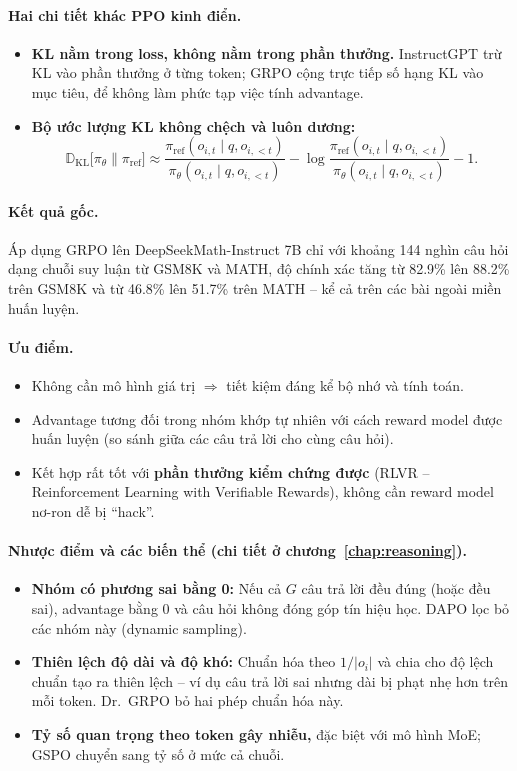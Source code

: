 \paragraph{Hai chi tiết khác PPO kinh điển.}
\begin{itemize}
	\item \textbf{KL nằm trong loss, không nằm trong phần thưởng.} InstructGPT trừ KL vào phần thưởng ở từng token; GRPO cộng trực tiếp số hạng KL vào mục tiêu, để không làm phức tạp việc tính advantage.
	\item \textbf{Bộ ước lượng KL không chệch và luôn dương:}
	\[
	\mathbb{D}_{\text{KL}}\big[\pi_\theta\|\pi_{\text{ref}}\big] \approx \frac{\pi_{\text{ref}}(o_{i,t}\mid q, o_{i,<t})}{\pi_\theta(o_{i,t}\mid q, o_{i,<t})} - \log\frac{\pi_{\text{ref}}(o_{i,t}\mid q, o_{i,<t})}{\pi_\theta(o_{i,t}\mid q, o_{i,<t})} - 1.
	\]
\end{itemize}

\paragraph{Kết quả gốc.} Áp dụng GRPO lên DeepSeekMath-Instruct 7B chỉ với khoảng 144 nghìn câu hỏi dạng chuỗi suy luận từ GSM8K và MATH, độ chính xác tăng từ 82.9\% lên 88.2\% trên GSM8K và từ 46.8\% lên 51.7\% trên MATH -- kể cả trên các bài ngoài miền huấn luyện.

\paragraph{Ưu điểm.}
\begin{itemize}
	\item Không cần mô hình giá trị $\Rightarrow$ tiết kiệm đáng kể bộ nhớ và tính toán.
	\item Advantage tương đối trong nhóm khớp tự nhiên với cách reward model được huấn luyện (so sánh giữa các câu trả lời cho cùng câu hỏi).
	\item Kết hợp rất tốt với \textbf{phần thưởng kiểm chứng được} (RLVR -- Reinforcement Learning with Verifiable Rewards), không cần reward model nơ-ron dễ bị “hack”.
\end{itemize}

\paragraph{Nhược điểm và các biến thể (chi tiết ở chương~\ref{chap:reasoning}).}
\begin{itemize}
	\item \textbf{Nhóm có phương sai bằng 0:} Nếu cả $G$ câu trả lời đều đúng (hoặc đều sai), advantage bằng 0 và câu hỏi không đóng góp tín hiệu học. DAPO \cite{yu2025dapo} lọc bỏ các nhóm này (dynamic sampling).
	\item \textbf{Thiên lệch độ dài và độ khó:} Chuẩn hóa theo $1/|o_i|$ và chia cho độ lệch chuẩn tạo ra thiên lệch -- ví dụ câu trả lời sai nhưng dài bị phạt nhẹ hơn trên mỗi token. Dr.~GRPO \cite{liu2025drgrpo} bỏ hai phép chuẩn hóa này.
	\item \textbf{Tỷ số quan trọng theo token gây nhiễu,} đặc biệt với mô hình MoE; GSPO \cite{zheng2025gspo} chuyển sang tỷ số ở mức cả chuỗi.
\end{itemize}

